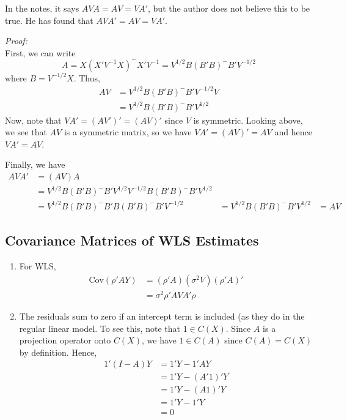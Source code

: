 \documentclass[12pt]{article}
\newcommand{\Cov}{\mathrm{Cov}}
\numberwithin{equation}{section}
\begin{document}
In the notes, it says $AVA = AV = VA'$, but the author does not believe this to be true. He has found that $AVA' = AV = VA'$.

\textit{Proof:} \\
First, we can write
\begin{equation*}
  A = X(X'V^{-1} X)^{-} X'V^{-1} = V^{1/2}B(B'B)^{-} B'V^{-1/2}
\end{equation*}
where $B = V^{-1/2} X$. Thus,
%
\begin{align*}
  AV &= V^{1/2} B(B'B)^{-}B'V^{-1/2} V \\
    &= V^{1/2} B(B'B)^{-} B'V^{1/2}
\end{align*}
%
Now, note that $VA' = (AV')' = (AV)'$ since $V$ is symmetric. Looking above, we see that $AV$ is a symmetric matrix, so we have $VA' = (AV)' = AV$ and hence $VA' = AV$.

Finally, we have
\begin{align*}
  AVA' &= (AV)A \\
    &= V^{1/2}B(B'B)^{-}B'V^{1/2}V^{-1/2}B(B'B)^{-}B'V^{1/2} \\
    &= V^{1/2} B(B'B)^{-}B' B(B'B)^{-} B'V^{-1/2}
    &= V^{1/2} B(B'B)^{-} B' V^{1/2}
    &= AV
\end{align*}

\subsection{Covariance Matrices of WLS Estimates}
\begin{enumerate}
  \item For WLS,
  \begin{align*}
    \Cov(\rho'AY) &= (\rho'A)(\sigma^2V) (\rho'A)' \\
      &= \sigma^2 \rho'A V A' \rho
  \end{align*}
  \item The residuals sum to zero if an intercept term is included (as they do in the regular linear model. To see this, note that $1 \in C(X)$. Since $A$ is a projection operator onto $C(X)$, we have $1 \in C(A)$ since $C(A) = C(X)$ by definition. Hence,
  \begin{align*}
    1'(I - A)Y &= 1'Y - 1'AY \\
      &= 1'Y - (A'1)'Y \\
      &= 1'Y - (A1)'Y \\
      &= 1'Y - 1'Y \\
      &= 0
  \end{align*}
\end{enumerate}
\end{document}
